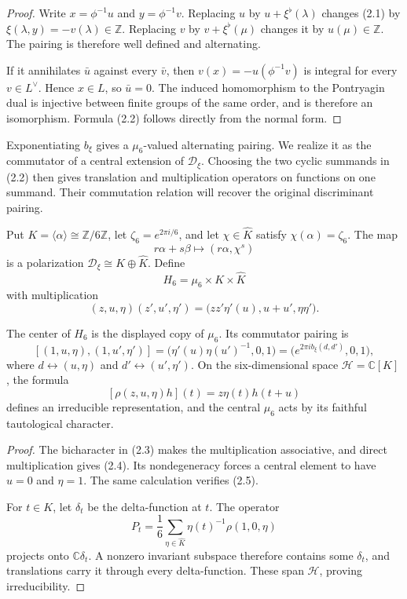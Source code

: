 \documentclass[11pt]{article}
\numberwithin{equation}{section}
\begin{document}
\begin{proof}
Write $x=\phi^{-1}u$ and $y=\phi^{-1}v$.  Replacing $u$ by
$u+\xi^\flat(\lambda)$ changes (2.1) by
$\xi(\lambda,y)=-v(\lambda)\in\mathbb Z$. Replacing $v$ by
$v+\xi^\flat(\mu)$ changes it by $u(\mu)\in\mathbb Z$.  The pairing is
therefore well defined and alternating.

If it annihilates $\bar u$ against
every $\bar v$, then $v(x)=-u(\phi^{-1}v)$ is integral for every
$v\in L^\vee$.  Hence $x\in L$, so $\bar u=0$.  The induced homomorphism
to the Pontryagin dual is injective between finite groups of the same order,
and is therefore an isomorphism.  Formula (2.2) follows directly from the
normal form.
\end{proof}

Exponentiating $b_\xi$ gives a $\mu_6$-valued alternating pairing.
We realize it as the commutator of a central extension of
$\mathcal D_\xi$. Choosing the two cyclic summands in (2.2) then gives
translation and multiplication operators on functions on one summand.
Their commutation relation will recover the original discriminant pairing.

Put $K=\langle\alpha\rangle\cong\mathbb Z/6\mathbb Z$, let
$\zeta_6=e^{2\pi i/6}$, and let $\chi\in\widehat K$ satisfy
$\chi(\alpha)=\zeta_6$.  The map
\[
          r\alpha+s\beta\longmapsto(r\alpha,\chi^s)
\]
is a polarization $\mathcal D_\xi\cong K\oplus\widehat K$.  Define
\[
 H_6=\mu_6\times K\times\widehat K
\]
with multiplication
\[
 (z,u,\eta)(z',u',\eta')
   =\bigl(zz'\eta'(u),u+u',\eta\eta'\bigr).                       \tag{2.3}
\]

\begin{theorem}
The center of $H_6$ is the displayed copy of $\mu_6$.  Its commutator
pairing is
\[
 [(1,u,\eta),(1,u',\eta')]
  =\bigl(\eta'(u)\eta(u')^{-1},0,1\bigr)
  =\bigl(e^{2\pi i b_\xi(d,d')},0,1\bigr),                        \tag{2.4}
\]
where $d\leftrightarrow(u,\eta)$ and $d'\leftrightarrow(u',\eta')$.
On the six-dimensional space $\mathcal H=\mathbb C[K]$, the formula
\[
 [\rho(z,u,\eta)h](t)=z\eta(t)h(t+u)                              \tag{2.5}
\]
defines an irreducible representation, and the central $\mu_6$ acts by its
faithful tautological character.
\end{theorem}

\begin{proof}
The bicharacter in (2.3) makes the multiplication associative, and direct
multiplication gives (2.4).  Its nondegeneracy forces a central element to
have $u=0$ and $\eta=1$.  The same calculation verifies (2.5).

For $t\in K$, let $\delta_t$ be the delta-function at $t$.  The operator
\[
 P_t=\frac16\sum_{\eta\in\widehat K}
        \eta(t)^{-1}\rho(1,0,\eta)
\]
projects onto $\mathbb C\delta_t$.  A nonzero invariant subspace therefore
contains some $\delta_t$, and translations carry it through every
delta-function.  These span $\mathcal H$, proving irreducibility.
\end{proof}
\end{document}
